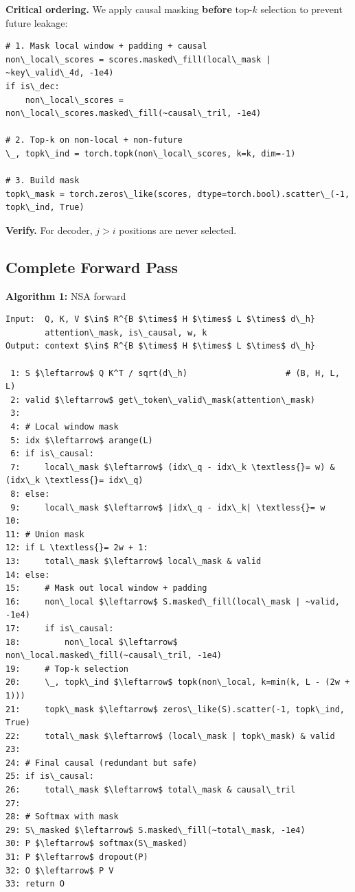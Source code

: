 \textbf{Critical ordering.} We apply causal masking \textbf{before} top-$k$ selection 
to prevent future leakage:

\begin{lstlisting}
# 1. Mask local window + padding + causal
non\_local\_scores = scores.masked\_fill(local\_mask | ~key\_valid\_4d, -1e4)
if is\_dec:
    non\_local\_scores = non\_local\_scores.masked\_fill(~causal\_tril, -1e4)

# 2. Top-k on non-local + non-future
\_, topk\_ind = torch.topk(non\_local\_scores, k=k, dim=-1)

# 3. Build mask
topk\_mask = torch.zeros\_like(scores, dtype=torch.bool).scatter\_(-1, topk\_ind, True)
\end{lstlisting}

\textbf{Verify.} For decoder, $j > i$ positions are never selected.

\subsection{Complete Forward Pass}

\textbf{Algorithm 1:} NSA forward
\begin{lstlisting}
Input:  Q, K, V $\in$ R^{B $\times$ H $\times$ L $\times$ d\_h}
        attention\_mask, is\_causal, w, k
Output: context $\in$ R^{B $\times$ H $\times$ L $\times$ d\_h}

 1: S $\leftarrow$ Q K^T / sqrt(d\_h)                    # (B, H, L, L)
 2: valid $\leftarrow$ get\_token\_valid\_mask(attention\_mask)
 3:
 4: # Local window mask
 5: idx $\leftarrow$ arange(L)
 6: if is\_causal:
 7:     local\_mask $\leftarrow$ (idx\_q - idx\_k \textless{}= w) & (idx\_k \textless{}= idx\_q)
 8: else:
 9:     local\_mask $\leftarrow$ |idx\_q - idx\_k| \textless{}= w
10:
11: # Union mask
12: if L \textless{}= 2w + 1:
13:     total\_mask $\leftarrow$ local\_mask & valid
14: else:
15:     # Mask out local window + padding
16:     non\_local $\leftarrow$ S.masked\_fill(local\_mask | ~valid, -1e4)
17:     if is\_causal:
18:         non\_local $\leftarrow$ non\_local.masked\_fill(~causal\_tril, -1e4)
19:     # Top-k selection
20:     \_, topk\_ind $\leftarrow$ topk(non\_local, k=min(k, L - (2w + 1)))
21:     topk\_mask $\leftarrow$ zeros\_like(S).scatter(-1, topk\_ind, True)
22:     total\_mask $\leftarrow$ (local\_mask | topk\_mask) & valid
23:
24: # Final causal (redundant but safe)
25: if is\_causal:
26:     total\_mask $\leftarrow$ total\_mask & causal\_tril
27:
28: # Softmax with mask
29: S\_masked $\leftarrow$ S.masked\_fill(~total\_mask, -1e4)
30: P $\leftarrow$ softmax(S\_masked)
31: P $\leftarrow$ dropout(P)
32: O $\leftarrow$ P V
33: return O
\end{lstlisting}

